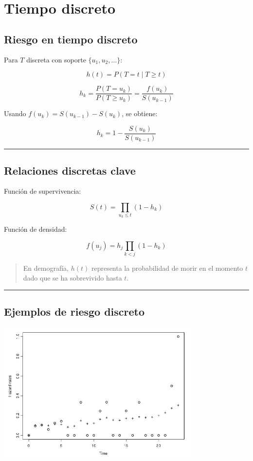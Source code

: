 \documentclass[
  letterpaper,
  ignorenonframetext,
  DIV=11,
  numbers=noendperiod]{scrartcl}
\begin{document}
\section{Tiempo discreto}\label{tiempo-discreto}

\subsection{Riesgo en tiempo discreto}\label{riesgo-en-tiempo-discreto}

Para \(T\) discreta con soporte \(\{u_1, u_2, \dots\}\):

\[
h(t) = P(T = t \mid T \ge t)
\]

\[
h_k = \frac{P(T = u_k)}{P(T \ge u_k)} = \frac{f(u_k)}{S(u_{k-1})}
\]

Usando \(f(u_k) = S(u_{k-1}) - S(u_k)\), se obtiene:

\[
h_k = 1 - \frac{S(u_k)}{S(u_{k-1})}
\]

\begin{center}\rule{0.5\linewidth}{0.5pt}\end{center}

\subsection{Relaciones discretas
clave}\label{relaciones-discretas-clave}

Función de supervivencia:

\[
S(t) = \prod_{u_k \le t} (1 - h_k)
\]

Función de densidad:

\[
f(u_j) = h_j \prod_{k<j} (1 - h_k)
\]

\begin{quote}
En demografía, \(h(t)\) representa la probabilidad de morir en el
momento \(t\) dado que se ha sobrevivido hasta \(t\).
\end{quote}

\begin{center}\rule{0.5\linewidth}{0.5pt}\end{center}

\subsection{Ejemplos de riesgo
discreto}\label{ejemplos-de-riesgo-discreto}

\begin{center}
\includegraphics[width=4in,height=\textheight,keepaspectratio]{figura/ejempRiesgoDiscreto.jpg}
\end{center}
\end{document}
